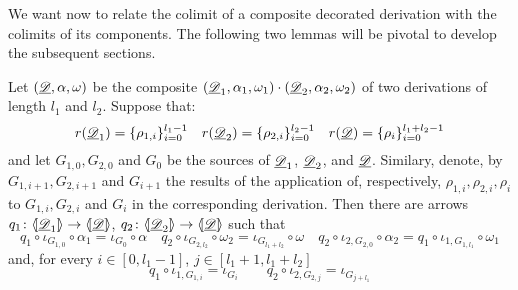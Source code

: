 We want now to relate the colimit of a composite decorated derivation with the colimits of its components. The following two lemmas will be pivotal to develop the subsequent sections.

\begin{lemma}\label{rem:dett}
	Let $(\underline{\mathscr{D}}, \alpha, \omega)$ be the composite $(\underline{\mathscr{D}}_1, \alpha_1, \omega_1)\cdot (\underline{\mathscr{D}}_2, \alpha_2, \omega_2)$ of two derivations of length $l_1$ and $l_2$. Suppose that:
	\[r(\underline{\mathscr{D}}_1)=\{\rho_{1,i}\}_{i=0}^{l_1-1} \quad r(\underline{\mathscr{D}}_2)=\{\rho_{2,i}\}_{i=0}^{l_2-1} \quad  r(\underline{\mathscr{D}})=\{\rho_{i}\}_{i=0}^{l_1+l_2-1}\]
	and let  $G_{1,0}, G_{2,0}$ and $G_{0}$ be the sources of $\underline{\mathscr{D}}_1$, $\underline{\mathscr{D}}_2$,  and $\underline{\mathscr{D}}$. Similary, denote, by $G_{1,i+1}, G_{2,i+1}$ and $G_{i+1}$ the results of the application of, respectively, $\rho_{1,i}, \rho_{2,i}, \rho_i$ to $G_{1,i}, G_{2,i}$ and $G_{i}$  in the corresponding derivation. Then there are arrows $q_1\colon \langle \hspace{-1.85pt}[ \underline{\mathscr{D}}_1]\hspace{-1.85pt}\rangle \to \langle \hspace{-1.85pt}[ \underline{\mathscr{D}}]\hspace{-1.85pt}\rangle$, $q_2\colon \langle \hspace{-1.85pt}[ \underline{\mathscr{D}}_2]\hspace{-1.85pt}\rangle \to \langle \hspace{-1.85pt}[ \underline{\mathscr{D}}]\hspace{-1.85pt}\rangle$ such that
	\[ q_1\circ \iota_{G_{1,0}}\circ \alpha_1 = \iota_{G_{0}}\circ \alpha \quad  q_2\circ \iota_{G_{2,l_2}}\circ \omega_2 = \iota_{G_{l_1+l_2}}\circ \omega \quad 	q_2\circ \iota_{2, G_{2,0}} \circ \alpha_2=q_1\circ \iota_{1, G_{1, l_1}}\circ \omega_1\]
	and, for every $i\in [0, l_1-1]$, $j\in [l_1+1, l_1+l_2]$
	\[q_1\circ \iota_{1, G_{1,i}}=\iota_{G_{i}}\qquad q_2\circ \iota_{2, G_{2,j}}=\iota_{G_{j+l_1}} \]
\end{lemma}
